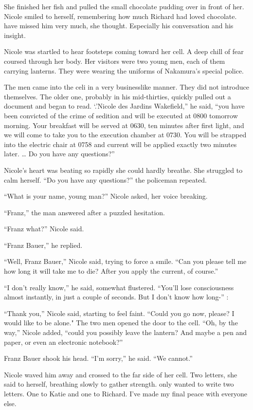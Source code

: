 \documentclass[]{article}
\begin{document}
{{She finished her fish and pulled the small chocolate pudding over in front of her.  Nicole smiled to herself, remembering how much Richard had loved chocolate.  have missed him very much, she thought.  Especially his conversation and his insight.

Nicole was startled to hear footsteps coming toward her cell.  A deep chill of fear coursed through her body.  Her visitors were two young men, each of them carrying lanterns.  They were wearing the uniforms of Nakamura’s special police.

The men came into the celi in a very businesslike manner.  They did not introduce themselves.  The older one, probably in his mid-thirties, quickly pulled out a document and began to read.  ‘.’Nicole des Jardins Wakefield,” he said, “you have been convicted of the crime of sedition and will be executed at 0800 tomorrow morning.  Your breakfast will be served at 0630, ten minutes after first light, and we will come to take you to the execution chamber at 0730.  You will be strapped into the electric chair at 0758 and current will be applied exactly two minutes later.  … Do you have any questions?”

Nicole’s heart was beating so rapidly she could hardly breathe.  She struggled to calm herself.  “Do you have any questions?” the policeman repeated.

“What is your name, young man?” Nicole asked, her voice breaking.

“Franz,” the man answered after a puzzled hesitation.

“Franz what?” Nicole said.

“Franz Bauer,” he replied.

“Well, Franz Bauer,” Nicole said, trying to force a smile.  “Can you please tell me how long it will take me to die? After you apply the current, of course.”

“I don’t really know,” he said, somewhat flustered.  “You’ll lose consciousness almost instantly, in just a couple of seconds.  But I don’t know how long-” :

“Thank you,” Nicole said, starting to feel faint.  “Could you go now, please? I would like to be alone."  The two men opened the door to the cell.  “Oh, by the way,” Nicole added, “could you possibly leave the lantern? And maybe a pen and paper, or even an electronic notebook?”

Franz Bauer shook his head.  “I’m sorry,” he said.  “We cannot.”

Nicole waved him away and crossed to the far side of her cell.  Two letters, she said to herself, breathing slowly to gather strength.  only wanted to write two letters.  One to Katie and one to Richard.  I’ve made my final peace with everyone else.

}}
\end{document}
